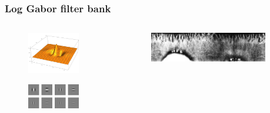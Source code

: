 \documentclass{beamer}
\begin{document}
\begin{frame}
    [fragile] \frametitle{Log Gabor filter bank}

    \begin{columns}
        \begin{column}{0.5\textwidth}
            \begin{figure}[H]
            \centering
              \includegraphics[width=0.8\textwidth]{../report/iris/log_gabor_2d.png}
                \label{fig:2Dloggabor}
            \end{figure}
            \begin{figure}[t]
                \centering
              \includegraphics[width=0.8\textwidth]{../report/iris/2d_log_gabor_filter.png}
                \label{fig:filter_bank}
            \end{figure}
        \end{column}
        \begin{column}{0.5\textwidth}
            \begin{figure}[t]
                \centering
              \includegraphics[width=0.9\textwidth]{gabor/iris_equal.png}

\end{figure}
\end{column}
\end{columns}
\end{frame}
\end{document}
